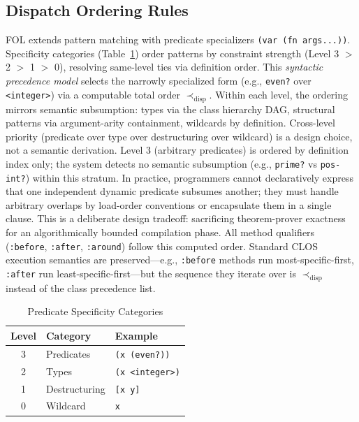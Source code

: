\documentclass[sigconf,nonacm]{acmart}
\begin{document}
\subsection{Dispatch Ordering Rules}
FOL extends pattern matching with predicate specializers \texttt{(var (fn args...))}. Specificity categories (Table~\ref{tab:specificity}) order patterns by constraint strength (Level 3 $>$ 2 $>$ 1 $>$ 0), resolving same-level ties via definition order. This \textit{syntactic precedence model} selects the narrowly specialized form (e.g., \texttt{even?} over \texttt{<integer>}) via a computable total order $\prec_{\text{disp}}$. Within each level, the ordering mirrors semantic subsumption: types via the class hierarchy DAG, structural patterns via argument-arity containment, wildcards by definition. Cross-level priority (predicate over type over destructuring over wildcard) is a design choice, not a semantic derivation. Level 3 (arbitrary predicates) is ordered by definition index only; the system detects no semantic subsumption (e.g., \texttt{prime?} vs \texttt{pos-int?}) within this stratum. In practice, programmers cannot declaratively express that one independent dynamic predicate subsumes another; they must handle arbitrary overlaps by load-order conventions or encapsulate them in a single clause. This is a deliberate design tradeoff: sacrificing theorem-prover exactness for an algorithmically bounded compilation phase. All method qualifiers (\texttt{:before}, \texttt{:after}, \texttt{:around}) follow this computed order. Standard CLOS execution semantics are preserved---e.g., \texttt{:before} methods run most-specific-first, \texttt{:after} run least-specific-first---but the sequence they iterate over is $\prec_{\text{disp}}$ instead of the class precedence list.

\begin{table}[htbp]
\centering
\caption{Predicate Specificity Categories}
\label{tab:specificity}
\small
\begin{tabular}{cll}
\toprule
\textbf{Level} & \textbf{Category} & \textbf{Example} \\
\midrule
3 & Predicates & \texttt{(x (even?))} \\
2 & Types & \texttt{(x <integer>)} \\
1 & Destructuring & \texttt{[x y]} \\
0 & Wildcard & \texttt{x} \\
\bottomrule
\end{tabular}
\end{table}
\end{document}
